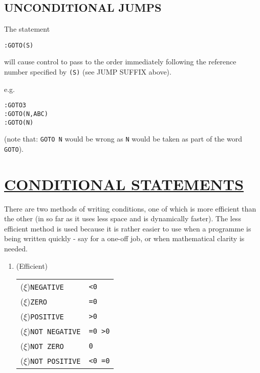 \documentclass[10pt, a4paper, oneside]{article}
\newcommand{\myuline}[1]{\uline{#1}}
\newcommand{\mytt}[1]{\texttt{\scriptsize #1}}
\newcommand{\mytt}[1]{\texttt{\small #1}}
\begin{document}
\begin{multicols}{2}
\subsection{UNCONDITIONAL JUMPS}

The statement
\begin{addmargin}[1cm]{1em}%
\begin{flushleft}
\mytt{:GOTO(\rlap{/}S)}
\end{flushleft}
\end{addmargin}

\begin{flushleft}
will cause control to pass to the order immediately
following the reference number specified by \mytt{(\rlap{/}S)} (see
JUMP SUFFIX above).
\end{flushleft}

\begin{flushleft}
e.g.
\end{flushleft}

\begin{addmargin}[1cm]{1em}%
\begin{lstlisting}
:GOTO3
:GOTO(N,ABC)
:GOTO(N)
\end{lstlisting}
\end{addmargin}

\begin{flushleft}
(note that: \mytt{GOTO N} would be wrong as \mytt{N} would be taken
as part of the word \mytt{GOTO}).
\end{flushleft}


\section{\myuline{CONDITIONAL STATEMENTS}}

There are two methods of writing conditions, one
of which is more efficient than the other (in so far
as it uses less space and is dynamically faster).  The
less efficient method is used because it is rather
easier to use when a programme is being written
quickly - say for a one-off job, or when mathematical
clarity is needed.

\renewcommand{\labelenumi}{\myuline{Type \theenumi}}
\begin{enumerate}

\item\label{it:EFF} (Efficient)

\begin{tabular}{ll}
($\xi$)\mytt{NEGATIVE}     & \mytt{<0} \\
($\xi$)\mytt{ZERO}         & \mytt{=0} \\
($\xi$)\mytt{POSITIVE}     & \mytt{>0} \\
($\xi$)\mytt{NOT NEGATIVE} & \mytt{=0 >0} \\
($\xi$)\mytt{NOT ZERO}     & \mytt{<0 >0} \\
($\xi$)\mytt{NOT POSITIVE} & \mytt{<0 =0} \\
\end{tabular}


\end{enumerate}
\end{multicols}
\end{document}
